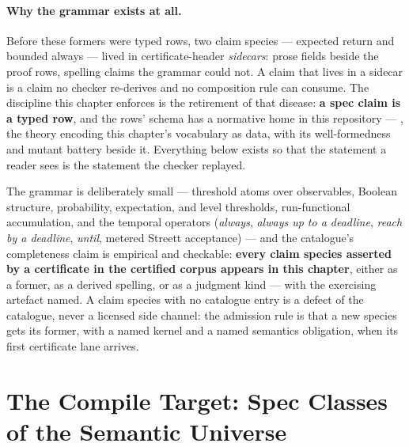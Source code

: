 \paragraph{Why the grammar exists at all.} Before these formers were
typed rows, two claim species --- expected return and bounded always
--- lived in certificate-header \emph{sidecars}: prose fields beside
the proof rows, spelling claims the grammar could not. A claim that
lives in a sidecar is a claim no checker re-derives and no
composition rule can consume. The discipline this chapter enforces is
the retirement of that disease: \textbf{a spec claim is a typed row},
and the rows' schema has a normative home in this repository ---
, the theory encoding this chapter's
vocabulary as data, with its well-formedness and mutant battery
beside it. Everything below exists so that the statement a reader
sees is the statement the checker replayed.

The grammar is deliberately small --- threshold atoms over
observables, Boolean structure, probability, expectation, and level
thresholds, run-functional accumulation, and the temporal
operators (\emph{always}, \emph{always up to a deadline},
\emph{reach by a deadline}, \emph{until}, metered Streett
acceptance) --- and
the catalogue's completeness claim is empirical and checkable:
\textbf{every claim species asserted by a certificate in the
certified corpus appears in this chapter}, either as a former, as a
derived spelling, or as a judgment kind --- with the exercising
artefact named. A claim species with no catalogue entry is a defect
of the catalogue, never a licensed side channel: the admission rule
is that a new species gets its former, with a named kernel and a
named semantics obligation, when its first certificate lane arrives.

\section{The Compile Target: Spec Classes of the Semantic Universe}
\label{sec:spec-lang-target}

